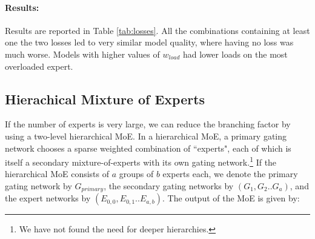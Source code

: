 \documentclass{article} %
\begin{document}
\begin{table}[h!]
\caption{Experiments with different combinations of losses. }
\label{tab:losses}
\begin{center}
\setlength\tabcolsep{3pt}
\end{center}
\end{table}

\paragraph{Results:} Results are reported in Table \ref{tab:losses}.  All the combinations containing at least one the two losses led to very similar model quality, where having no loss was much worse.  Models with higher values of $w_{load}$ had lower loads on the most overloaded expert.





\subsection{Hierachical Mixture of Experts} \label{sec:hierarchical}  If the number of experts is very large, we can reduce the branching factor by using a two-level hierarchical MoE.  In a hierarchical MoE, a primary gating network chooses a sparse weighted combination of ``experts", each of which is itself a secondary mixture-of-experts with its own gating network.\footnote{ We have not found the need for deeper hierarchies.}  If the hierarchical MoE consists of $a$ groups of $b$ experts each, we denote the primary gating network by $G_{primary}$, the secondary gating networks by $(G_1, G_2 .. G_a)$, and the expert networks by $(E_{0,0}, E_{0,1} .. E_{a,b})$.   The output of the MoE is given by:
\end{document}
